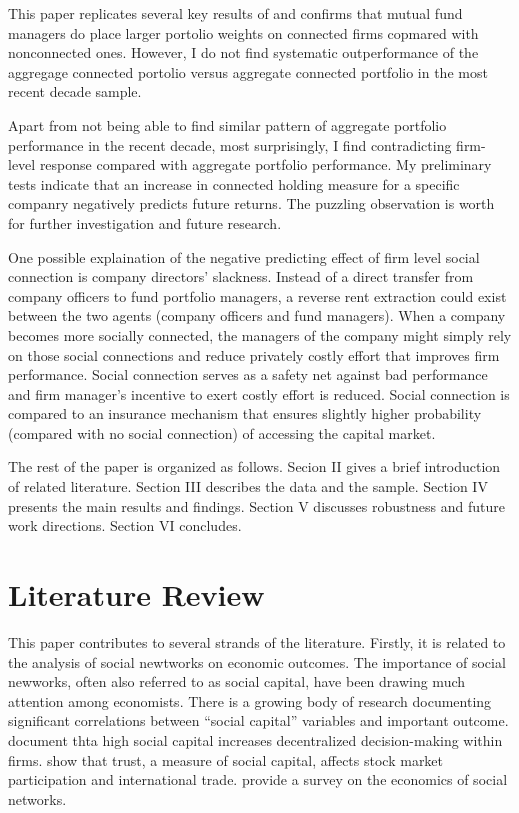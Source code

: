 \documentclass[11pt]{article}
\begin{document}
\begin{doublespace}
This paper replicates several key results of \cite{cohen2008small} and confirms that mutual fund managers do place larger portolio weights on connected firms copmared with nonconnected ones. However, I do not find systematic outperformance of the aggregage connected portolio versus aggregate connected portfolio in the most recent decade sample. 

Apart from not being able to find similar pattern of aggregate portfolio performance in the recent decade, most surprisingly, I find contradicting firm-level response compared with \cite{cohen2008small} aggregate portfolio performance. My preliminary tests indicate that an increase in connected holding measure for a specific companry negatively predicts future returns. The puzzling observation is worth for further investigation and future research. 

One possible explaination of the negative predicting effect of firm level social connection is company directors' slackness. Instead of a direct transfer from company officers to fund portfolio managers, a reverse rent extraction could exist between the two agents (company officers and fund managers). When a company becomes more socially connected, the managers of the company might simply rely on those social connections and reduce privately costly effort that improves firm performance. Social connection serves as a safety net against bad performance and firm manager's incentive to exert costly effort is reduced. Social connection is compared to an insurance mechanism that ensures slightly higher probability (compared with no social connection) of accessing the capital market. 

The rest of the paper is organized as follows. Secion II gives a brief introduction of related literature. Section III describes the data and the sample. Section IV presents the main results and findings. Section V discusses robustness and future work directions. Section VI concludes. 

\section{Literature Review}
This paper contributes to several strands of the literature. Firstly, it is related to the analysis of social newtworks on economic outcomes. The importance of social newworks, often also referred to as social capital, have been drawing much attention among economists. There is a growing body of research documenting significant correlations between ``social capital'' variables and important outcome. \cite{bloom2012organization} document thta high social capital increases decentralized decision-making within firms. \cite{guiso2004role} show that trust, a measure of social capital, affects stock market participation and international trade. \cite{jackson2005economics} provide a survey on the economics of social networks. 


\end{doublespace}
\end{document}
